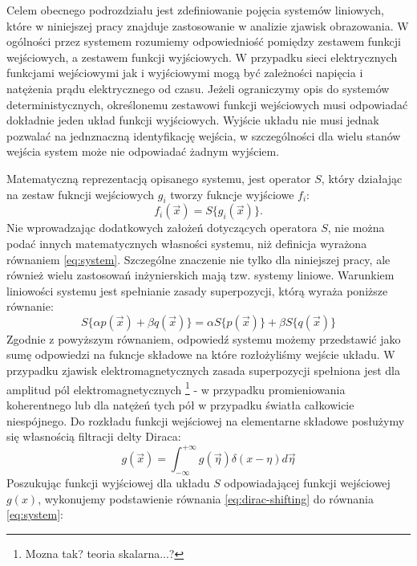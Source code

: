 Celem obecnego podrozdziału jest zdefiniowanie pojęcia systemów liniowych, które w niniejszej pracy znajduje zastosowanie w analizie zjawisk obrazowania. W ogólności przez systemem rozumiemy odpowiedniość pomiędzy zestawem funkcji wejściowych, a zestawem funkcji wyjściowych. W przypadku sieci elektrycznych funkcjami wejściowymi jak i wyjściowymi mogą być zależności napięcia i natężenia prądu elektrycznego od czasu. Jeżeli ograniczymy opis do systemów deterministycznych, określonemu zestawowi funkcji wejściowych musi odpowiadać dokładnie jeden układ funkcji wyjściowych. Wyjście układu nie musi jednak pozwalać na jednznaczną identyfikację wejścia, w szczególności dla wielu stanów wejścia system może nie odpowiadać żadnym wyjściem.

Matematyczną reprezentacją opisanego systemu, jest operator $S{}$, który działając na zestaw fukncji wejściowych $g_i$ tworzy fukncje wyjściowe $f_i$:
\begin{equation}
f_i(\vec{x})=S\{g_i(\vec{x})\}.
\label{eq:system}
\end{equation} 
Nie wprowadzając dodatkowych założeń dotyczących operatora $S{}$, nie można podać innych matematycznych własności systemu, niż definicja wyrażona równaniem \ref{eq:system}. Szczególne znaczenie nie tylko dla niniejszej pracy, ale również wielu zastosowań inżynierskich mają tzw. systemy liniowe. Warunkiem liniowości systemu jest spełnianie zasady superpozycji, którą wyraża poniższe równanie:
\begin{equation}
S\{\alpha p(\vec{x}) + \beta q(\vec{x})\} = \alpha S\{p(\vec{x})\} + \beta S\{q(\vec{x})\}
\label{eq:lin-system}
\end{equation}
Zgodnie z powyższym równaniem, odpowiedź systemu możemy przedstawić jako sumę odpowiedzi na fukncje składowe na które rozłożyliśmy wejście układu. W przypadku zjawisk elektromagnetycznych zasada superpozycji spełniona jest dla amplitud pól elektromagnetycznych \footnote{Mozna tak? teoria skalarna...?} - w przypadku promieniowania koherentnego lub dla natężeń tych pół w przypadku światła całkowicie niespójnego.  Do rozkładu funkcji wejściowej na elementarne składowe posłużymy się własnością filtracji delty Diraca:
\begin{equation}
g(\vec{x})=\int_{-\infty}^{+\infty} g(\vec{\eta}) \delta(x-\eta) d \vec{\eta}
\label{eq:dirac-shifting}
\end{equation}
Poszukując funkcji wyjściowej dla układu $S{}$ odpowiadającej funkcji wejściowej $g(x)$, wykonujemy podstawienie równania \ref{eq:dirac-shifting} do równania \ref{eq:system}:
